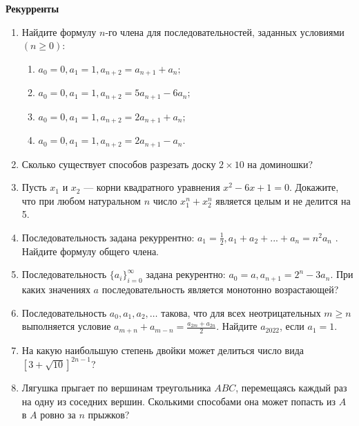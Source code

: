 \documentclass{article}
\begin{document}
\large
	

\begin{center}
\textbf{Рекурренты}
\end{center}

\begin{enumerate}[label*=\protect\fbox{\arabic{enumi}}]
	
\item Найдите формулу $n$-го члена для последовательностей, заданных условиями $( n  \geqslant 0)$:
\begin{enumerate}
	\item $a_0 = 0, a_1 = 1, a_{n + 2} = a_{n + 1} + a_n;$
	\item $a_0 = 0, a_1 = 1, a_{n + 2} = 5a_{n + 1} - 6a_n;$ 
	\item $a_0 = 0, a_1 = 1, a_{n + 2} = 2a_{n + 1} + a_n;$ 
	\item $a_0 = 0, a_1 = 1, a_{n + 2} = 2a_{n + 1} - a_n.$ 
\end{enumerate}

\item Сколько существует способов разрезать доску $2 \times 10$ на доминошки?

\item Пусть $ x_1 $ и $ x_2 $ — корни квадратного уравнения $ x^2 - 6x + 1 = 0 $. Докажите, что при любом натуральном $ n $ число $ x^n_1 + x^n_2 $ является целым и не делится на 5.

\item Последовательность задана рекуррентно: $ a_1 = \frac{1}{2} , a_1 + a_2 + . . . + a_n = n^2 a_n $ . Найдите формулу общего члена.

\item Последовательность $ \{a_i\}^{\infty}_{i=0} $ задана рекурентно: $ a_0 = a, a_{n+1} = 2^n - 3a_n $. При каких значениях $ a $ последовательность является монотонно возрастающей?

\item Последовательность $a_0, a_1, a_2, \ldots$ такова, что для всех неотрицательных $m \geq n$ выполняется условие $a_{m+n} + a_{m-n} = \frac{a_{2m} + a_{2n}}{2}$. Найдите $a_{2022}$, если $a_1 = 1$.

\item На какую наибольшую степень двойки может делиться число вида $\left[3 + \sqrt{10}\right]^{2n-1}$?

\item Лягушка прыгает по вершинам треугольника $ABC$, перемещаясь каждый раз на одну из соседних вершин. Сколькими способами она может попасть из $A$ в $A$ ровно за $n$ прыжков?


\end{enumerate}
\end{document}
